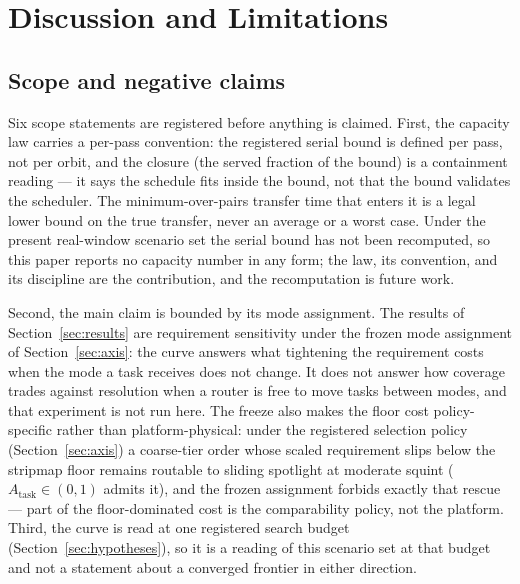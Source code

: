 \documentclass[preprint,authoryear]{elsarticle}
\begin{document}
\section{Discussion and Limitations}\label{sec:discussion}

\subsection{Scope and negative claims}\label{sec:scope}

Six scope statements are registered before anything is claimed. First, the capacity law carries a per-pass convention: the registered serial bound is defined per pass, not per orbit, and the closure (the served fraction of the bound) is a containment reading --- it says the schedule fits inside the bound, not that the bound validates the scheduler. The minimum-over-pairs transfer time that enters it is a legal lower bound on the true transfer, never an average or a worst case. Under the present real-window scenario set the serial bound has not been recomputed, so this paper reports no capacity number in any form; the law, its convention, and its discipline are the contribution, and the recomputation is future work.

Second, the main claim is bounded by its mode assignment. The results of Section~\ref{sec:results} are requirement sensitivity under the frozen mode assignment of Section~\ref{sec:axis}: the curve answers what tightening the requirement costs when the mode a task receives does not change. It does not answer how coverage trades against resolution when a router is free to move tasks between modes, and that experiment is not run here. The freeze also makes the floor cost policy-specific rather than platform-physical: under the registered selection policy (Section~\ref{sec:axis}) a coarse-tier order whose scaled requirement slips below the stripmap floor remains routable to sliding spotlight at moderate squint ($A_{\mathrm{task}}\in(0,1)$ admits it), and the frozen assignment forbids exactly that rescue --- part of the floor-dominated cost is the comparability policy, not the platform. Third, the curve is read at one registered search budget (Section~\ref{sec:hypotheses}), so it is a reading of this scenario set at that budget and not a statement about a converged frontier in either direction.
\end{document}
